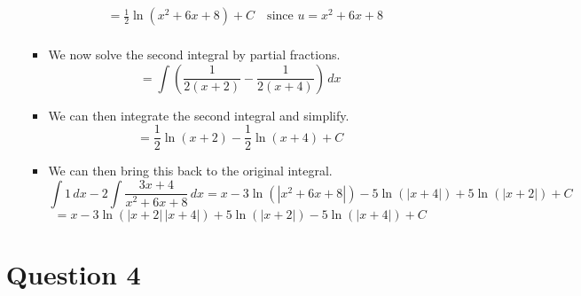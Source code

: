 \documentclass[12pt]{article}
\begin{document}
\begin{enumerate}[leftmargin=\labelsep]
\begin{enumerate}
\begin{itemize}[label={}]
\begin{equation*}
\begin{aligned}
                    &= \frac{1}{2} \ln(x^2+6x+8) + C \quad \text{since } u=x^2+6x+8 \\
                \end{aligned}
            \end{equation*}
            \item We now solve the second integral by partial fractions.
            \begin{equation*}
                = \int \left( \frac{1}{2(x+2)} - \frac{1}{2(x+4)} \right) \, dx
            \end{equation*}
            \item We can then integrate the second integral and simplify.
            \begin{equation*}
                = \frac{1}{2} \ln(x+2) - \frac{1}{2} \ln(x+4) + C
            \end{equation*}
            \item We can then bring this back to the original integral.
            \begin{equation*}
                \int 1 \, dx -2 \int \frac{3x+4}{x^2+6x+8} \, dx = x -3 \ln(|x^2+6x+8|) - 5 \ln(|x+4|) + 5 \ln(|x+2|) + C
            \end{equation*}
            \begin{equation*}
                = x -3 \ln(|x+2| \, |x+4|) + 5 \ln(|x+2|) - 5 \ln(|x+4|) + C
            \end{equation*}
        \end{itemize}
    \end{enumerate}

    \newpage

    \section*{Question 4}


\end{enumerate}
\end{document}
